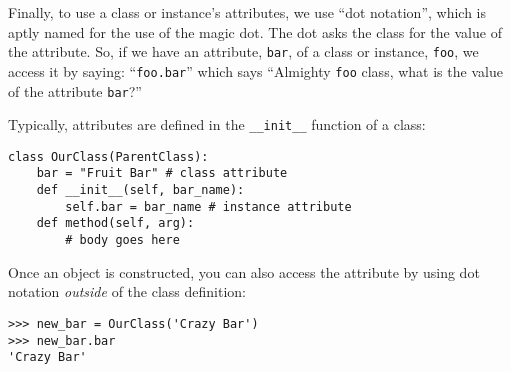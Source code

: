 Finally, to use a class or instance's attributes, we use ``dot notation'', which
is aptly named for the use of the magic dot. The dot asks the class for the
value of the attribute. So, if we have an attribute, \texttt{bar}, of a class or
instance, \texttt{foo}, we access it by saying: ``\texttt{foo.bar}'' which says
``Almighty \texttt{foo} class, what is the value of the attribute \texttt{bar}?''

Typically, attributes are defined in the \texttt{\_\_init\_\_} function of a
class:
\begin{lstlisting}
class OurClass(ParentClass):
    bar = "Fruit Bar" # class attribute
    def __init__(self, bar_name):
        self.bar = bar_name # instance attribute
    def method(self, arg):
        # body goes here
\end{lstlisting}

Once an object is constructed, you can also access the attribute by using dot
notation \emph{outside} of the class definition:
\begin{lstlisting}
>>> new_bar = OurClass('Crazy Bar')
>>> new_bar.bar
'Crazy Bar'
\end{lstlisting}

